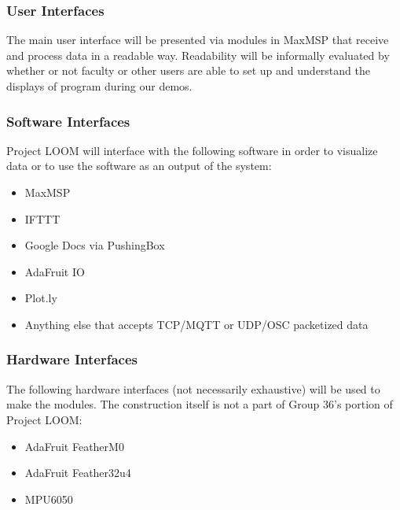 \documentclass[onecolumn, draftclsnofoot,10pt, compsoc]{IEEEtran}
\begin{document}
		\subsubsection{User Interfaces}
		The main user interface will be presented via modules in MaxMSP that receive and process data in a readable way. Readability will be informally evaluated by whether or not faculty or other users are able to set up and understand the displays of program during our demos.
		
		\subsubsection{Software Interfaces}
		Project LOOM will interface with the following software in order to visualize data or to use the software as an output of the system:
			\begin{itemize}
				\item MaxMSP
				\item IFTTT
				\item Google Docs via PushingBox
				\item AdaFruit IO
				\item Plot.ly
				\item Anything else that accepts TCP/MQTT or UDP/OSC packetized data
			\end{itemize}
		
		\subsubsection{Hardware Interfaces}
		The following hardware interfaces (not necessarily exhaustive) will be used to make the modules. The construction itself is not a part of Group 36's portion of Project LOOM:
		\begin{itemize}
			\item AdaFruit FeatherM0
			\item AdaFruit Feather32u4
			\item MPU6050
		\end{itemize}
		
\end{document}

